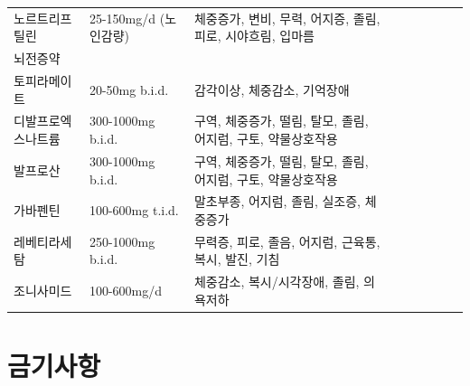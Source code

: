 \documentclass[]{book}
\begin{document}
\begin{longtable}{lllllllll}
노르트리프틸린 & 25-150mg/d (노인감량) & 체중증가, 변비, 무력, 어지증, 졸림, 피로, 시야흐림, 입마름\\
뇌전증약 &  & \\
\addlinespace
토피라메이트 & 20-50mg b.i.d. & 감각이상, 체중감소, 기억장애\\
디발프로엑스나트륨 & 300-1000mg b.i.d. & 구역, 체중증가, 떨림, 탈모, 졸림, 어지럼, 구토, 약물상호작용\\
발프로산 & 300-1000mg b.i.d. & 구역, 체중증가, 떨림, 탈모, 졸림, 어지럼, 구토, 약물상호작용\\
가바펜틴 & 100-600mg t.i.d. & 말초부종, 어지럼, 졸림, 실조증, 체중증가\\
레베티라세탐 & 250-1000mg b.i.d. & 무력증, 피로, 졸음, 어지럼, 근육통, 복시, 발진, 기침\\
\addlinespace
조니사미드 & 100-600mg/d & 체중감소, 복시/시각장애, 졸림, 의욕저하\\
\bottomrule
\end{longtable}

\hypertarget{section-24}{%
\section{금기사항}\label{section-24}}
\end{document}
